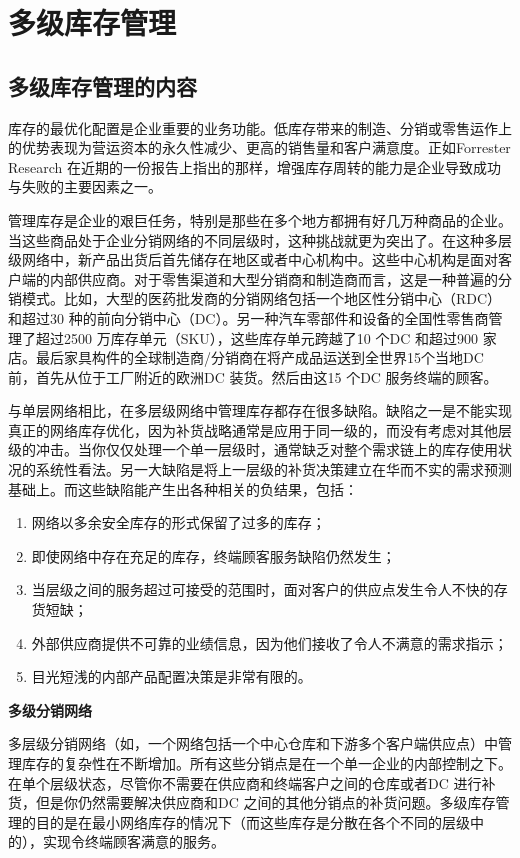 \section { 多级库存管理}

\subsection { 多级库存管理的内容}

    库存的最优化配置是企业重要的业务功能。低库存带来的制造、分销或零售运作上的优势表现为营运资本的永久性减少、更高的销售量和客户满意度。正如Forrester Research 在近期的一份报告上指出的那样，增强库存周转的能力是企业导致成功与失败的主要因素之一。

    管理库存是企业的艰巨任务，特别是那些在多个地方都拥有好几万种商品的企业。当这些商品处于企业分销网络的不同层级时，这种挑战就更为突出了。在这种多层级网络中，新产品出货后首先储存在地区或者中心机构中。这些中心机构是面对客户端的内部供应商。对于零售渠道和大型分销商和制造商而言，这是一种普遍的分销模式。比如，大型的医药批发商的分销网络包括一个地区性分销中心（RDC）和超过30 种的前向分销中心（DC）。另一种汽车零部件和设备的全国性零售商管理了超过2500 万库存单元（SKU），这些库存单元跨越了10 个DC 和超过900 家店。最后家具构件的全球制造商/分销商在将产成品运送到全世界15个当地DC 前，首先从位于工厂附近的欧洲DC 装货。然后由这15 个DC 服务终端的顾客。

    与单层网络相比，在多层级网络中管理库存都存在很多缺陷。缺陷之一是不能实现真正的网络库存优化，因为补货战略通常是应用于同一级的，而没有考虑对其他层级的冲击。当你仅仅处理一个单一层级时，通常缺乏对整个需求链上的库存使用状况的系统性看法。另一大缺陷是将上一层级的补货决策建立在华而不实的需求预测基础上。而这些缺陷能产生出各种相关的负结果，包括：

    \begin{enumerate}
        \item  网络以多余安全库存的形式保留了过多的库存；
        \item  即使网络中存在充足的库存，终端顾客服务缺陷仍然发生；
        \item  当层级之间的服务超过可接受的范围时，面对客户的供应点发生令人不快的存货短缺；
        \item  外部供应商提供不可靠的业绩信息，因为他们接收了令人不满意的需求指示；
        \item  目光短浅的内部产品配置决策是非常有限的。
    \end{enumerate}

\textbf { 多级分销网络}

    多层级分销网络（如，一个网络包括一个中心仓库和下游多个客户端供应点）中管理库存的复杂性在不断增加。所有这些分销点是在一个单一企业的内部控制之下。在单个层级状态，尽管你不需要在供应商和终端客户之间的仓库或者DC 进行补货，但是你仍然需要解决供应商和DC 之间的其他分销点的补货问题。多级库存管理的目的是在最小网络库存的情况下（而这些库存是分散在各个不同的层级中的），实现令终端顾客满意的服务。

